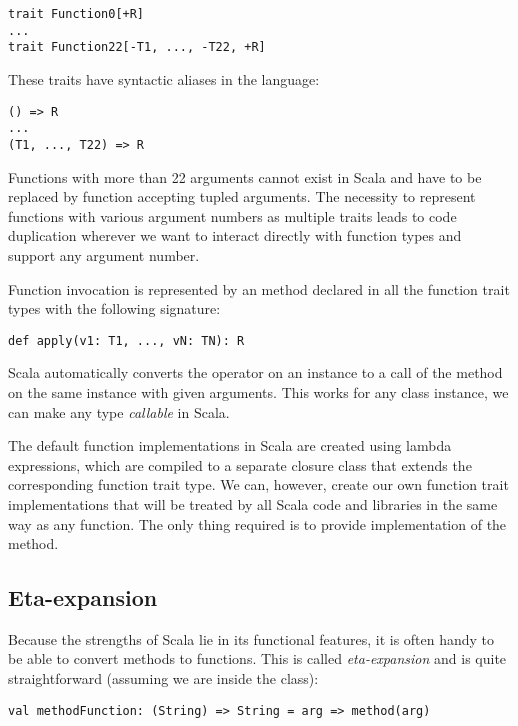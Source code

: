 \lstset{style=Scala}
\begin{lstlisting}
trait Function0[+R]
...
trait Function22[-T1, ..., -T22, +R]
\end{lstlisting}

These traits have syntactic aliases in the language:

\lstset{style=Scala}
\begin{lstlisting}
() => R
...
(T1, ..., T22) => R
\end{lstlisting}

Functions with more than 22 arguments cannot exist in Scala and have to be replaced by function accepting tupled arguments. The necessity to represent functions with various argument numbers as multiple traits leads to code duplication wherever we want to interact directly with function types and support any argument number.

Function invocation is represented by an  method declared in all the function trait types with the following signature:
\lstset{style=Scala}
\begin{lstlisting}
def apply(v1: T1, ..., vN: TN): R
\end{lstlisting}

Scala automatically converts the \inlinecode{()} operator on an instance to a call of the  method on the same instance with given arguments. This works for any class instance, we can make any type \textit{callable} in Scala.

The default function implementations in Scala are created using lambda expressions, which are compiled to a separate closure class that extends the corresponding function trait type. We can, however, create our own function trait implementations that will be treated by all Scala code and libraries in the same way as any function. The only thing required is to provide implementation of the  method.

\subsection{Eta-expansion}
\label{subsec:etaexpansion}

Because the strengths of Scala lie in its functional features, it is often handy to be able to convert methods to functions. This is called \textit{eta-expansion} and is quite straightforward (assuming we are inside the class):

\lstset{style=Scala}
\begin{lstlisting}
val methodFunction: (String) => String = arg => method(arg)
\end{lstlisting}

